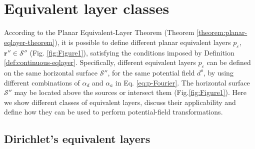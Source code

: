 \section{Equivalent layer classes}
\label{sec:eqlayer_classes}

According to the Planar Equivalent-Layer Theorem (Theorem \ref{theorem:planar-eqlayer-theorem}), 
it is possible to define different planar equivalent layers $p_{\varepsilon}$, 
$\mathbf{r}'' \in \mathcal{S}''$ (Fig. \ref{fig:Figure1}), 
satisfying the conditions imposed by Definition \ref{def:continuous-eqlayer}.
Specifically, different equivalent layers $p_{\varepsilon}$ can be defined
on the same horizontal surface $\mathcal{S}''$, for the same potential field $d^{o}$, 
by using different combinations of $\alpha_{d}$ and $\alpha_{a}$ in Eq. \ref{eq:p-Fourier}. 
The horizontal surface $\mathcal{S}''$ may be located above the sources 
or intersect them (Fig.\ref{fig:Figure1}).
Here we show different classes of equivalent layers, discuss their applicability and define how they 
can be used to perform potential-field transformations.

\subsection{Dirichlet's equivalent layers}

